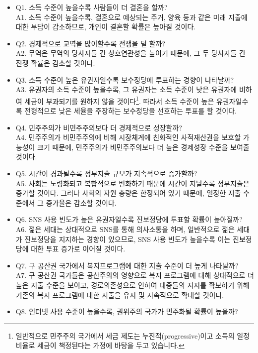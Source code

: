 \documentclass[
]{book}
\begin{document}
\begin{itemize}
\item
  Q1. 소득 수준이 높을수록 사람들이 더 결혼을 할까?\\
  A1. 소득 수준이 높을수록, 결혼으로 예상되는 주거, 양육 등과 같은 미래 지출에 대한 부담이 감소하므로, 개인이 결혼할 확률은 높아질 것이다.
\item
  Q2. 경제적으로 교역을 많이할수록 전쟁을 덜 할까?\\
  A2. 무역은 무역의 당사자들 간 상호연관성을 높이기 때문에, 그 두 당사자들 간 전쟁 확률은 감소할 것이다.
\item
  Q3. 소득 수준이 높은 유권자일수록 보수정당에 투표하는 경향이 나타날까?\\
  A3. 유권자의 소득 수준이 높을수록, 그 유권자는 소득 수준이 낮은 유권자에 비하여 세금이 부과되기를 원하지 않을 것이다\footnote{일반적으로 민주주의 국가에서 세금 제도는 누진적(progressive)이고 소득의 일정 비율로 세금이 책정된다는 가정에 바탕을 두고 있습니다.}. 따라서 소득 수준이 높은 유권자일수록 전형적으로 낮은 세율을 주장하는 보수정당을 선호하는 투표를 할 것이다.
\item
  Q4. 민주주의가 비민주주의보다 더 경제적으로 성장할까?\\
  A4. 민주주의가 비민주주의에 비해 시장체계에 친화적인 사적재산권을 보호할 가능성이 크기 때문에, 민주주의가 비민주주의보다 더 높은 경제성장 수준을 보여줄 것이다.
\item
  Q5. 시간이 경과될수록 정부지출 규모가 지속적으로 증가할까?\\
  A5. 사회는 노령화되고 복합적으로 변화하기 때문에 시간이 지날수록 정부지출은 증가할 것이다. 그러나 사회의 자원 총량은 한정되어 있기 때문에, 일정한 지출 수준에서 그 증가율은 감소할 것이다.
\item
  Q6. SNS 사용 빈도가 높은 유권자일수록 진보정당에 투표할 확률이 높아질까?\\
  A6. 젊은 세대는 상대적으로 SNS를 통해 의사소통을 하며, 일반적으로 젊은 세대가 진보정당을 지지하는 경향이 있으므로, SNS 사용 빈도가 높을수록 이는 진보정당에 대한 투표 증가로 이어질 것이다.
\item
  Q7. 구 공산권 국가에서 복지프로그램에 대한 지출 수준이 더 높게 나타날까?\\
  A7. 구 공산권 국가들은 공산주의의 영향으로 복지 프로그램에 대해 상대적으로 더 높은 지출 수준을 보이고, 경로의존성으로 인하여 대중들의 지지를 확보하기 위해 기존의 복지 프로그램에 대한 지출을 유지 및 지속적으로 확대할 것이다.
\item
  Q8. 인터넷 사용 수준이 높을수록, 권위주의 국가가 민주화될 확률이 높을까?\\

\end{itemize}
\end{document}
